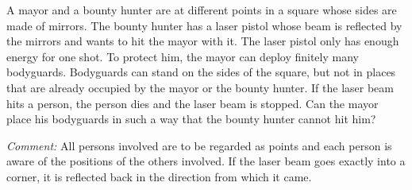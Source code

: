 A mayor and a bounty hunter are at different points in a square whose sides are made of mirrors.
The bounty hunter has a laser pistol whose beam is reflected by the mirrors and
wants to hit the mayor with it. The laser pistol only has enough energy for one shot.
To protect him, the mayor can deploy finitely many bodyguards.
Bodyguards can stand on the sides of the square, but not in places that are already
occupied by the mayor or the bounty hunter. If the laser beam hits a person,
the person dies and the laser beam is stopped. Can the mayor place his bodyguards in such a way
that the bounty hunter cannot hit him?

\emph{Comment:} All persons involved are to be regarded as points and each
person is aware of the positions of the others involved. If the laser beam goes exactly into a corner,
it is reflected back in the direction from which it came.
